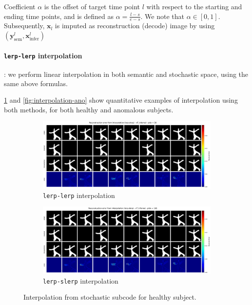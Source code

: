 Coefficient $\alpha$ is the offset of target time point $l$ with respect to the starting and ending time points, and is defined as $\alpha = \frac{l - s}{e - s}$. We note that $\alpha \in [0, 1]$. Subsequently, $\mathbf{x}_l$ is imputed as reconstruction (decode) image by using $(\mathbf{y}_{\text{sem}}^l, \mathbf{x}_{\text{infer}}^l)$

\paragraph{\texttt{lerp-lerp} interpolation}: we perform linear interpolation in both semantic and stochastic space, using the same above formulas. 

\cref{fig:interpolation-healthy} and \cref{fig:interpolation-ano} show quantitative examples of interpolation using both methods, for both healthy and anomalous subjects. 

\begin{figure}[htbp]
  \centering
  \begin{subfigure}{0.8\linewidth}
    \includegraphics[width=\linewidth]{figures/interpolation-lerp-lerp-id-50.pdf}
    \caption{\texttt{lerp-lerp} interpolation}
  \end{subfigure}

  \begin{subfigure}{0.8\linewidth}
    \includegraphics[width=\linewidth]{figures/interpolation-lerp-slerp-id-50.pdf}
    \caption{\texttt{lerp-slerp} interpolation}
  \end{subfigure}
  \caption{Interpolation from stochastic subcode for healthy subject. }
  \label{fig:interpolation-healthy}
\end{figure}

